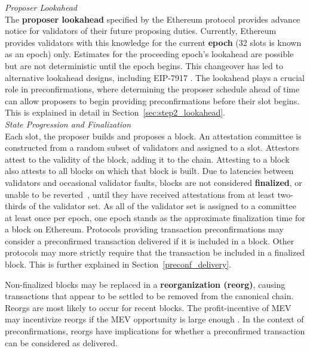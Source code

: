 \documentclass[a4paper]{article}
\theoremstyle{boldstyle}
\begin{document}
    \textit{Proposer Lookahead} \\
        The \textbf{proposer lookahead} specified by the Ethereum protocol provides advance notice for validators of their future proposing duties. Currently, Ethereum provides validators with this knowledge for the current \textbf{epoch} (32 slots is known as an epoch) only. Estimates for the proceeding epoch's lookahead are possible but are not deterministic until the epoch begins. This changeover has led to alternative lookahead designs, including EIP-7917 \cite{EIP7917}. The lookahead plays a crucial role in preconfirmations, where determining the proposer schedule ahead of time can allow proposers to begin providing preconfirmations before their slot begins. This is explained in detail in Section~\ref{sec:step2_lookahead}. \\
    
    \textit{State Progression and Finalization}  \\
        Each slot, the proposer builds and proposes a block. An attestation committee is constructed from a random subset of validators and assigned to a slot. Attestors attest to the validity of the block, adding it to the chain. Attesting to a block also attests to all blocks on which that block is built. Due to latencies between validators and occasional validator faults, blocks are not considered \textbf{finalized}, or unable to be reverted~\cite{ETH2_book}, until they have received attestations from at least two-thirds of the validator set. As all of the validator set is assigned to a committee at least once per epoch, one epoch stands as the approximate finalization time for a block on Ethereum. Protocols providing transaction preconfirmations may consider a preconfirmed transaction delivered if it is included in a block. Other protocols may more strictly require that the transaction be included in a finalized block. This is further explained in Section~\ref{preconf_delivery}.
        
        Non-finalized blocks may be replaced in a \textbf{reorganization (reorg)}, causing transactions that appear to be settled to be removed from the canonical chain. Reorgs are most likely to occur for recent blocks. The profit-incentive of MEV may incentivize reorgs if the MEV opportunity is large enough \cite{3_PoS_Attacks}. In the context of preconfirmations, reorgs have implications for whether a preconfirmed transaction can be considered as delivered. 
        
\end{document}
